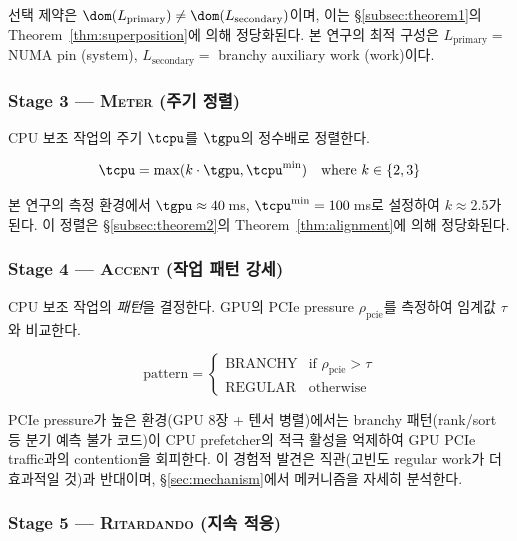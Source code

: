 선택 제약은 $\dom(L_{\text{primary}}) \neq \dom(L_{\text{secondary}})$이며, 이는 \S\ref{subsec:theorem1}의 Theorem~\ref{thm:superposition}에 의해 정당화된다.
본 연구의 최적 구성은 $L_{\text{primary}} = $ NUMA pin (system), $L_{\text{secondary}} = $ branchy auxiliary work (work)이다.

\subsubsection{Stage 3 --- \textsc{Meter} (주기 정렬)}

CPU 보조 작업의 주기 $\tcpu$를 $\tgpu$의 정수배로 정렬한다.

\begin{equation}
\tcpu = \max(k \cdot \tgpu, \tcpu^{\min}) \quad \text{where } k \in \{2, 3\}
\label{eq:meter}
\end{equation}

본 연구의 측정 환경에서 $\tgpu \approx 40$\,ms, $\tcpu^{\min} = 100$\,ms로 설정하여 $k \approx 2.5$가 된다.
이 정렬은 \S\ref{subsec:theorem2}의 Theorem~\ref{thm:alignment}에 의해 정당화된다.



\subsubsection{Stage 4 --- \textsc{Accent} (작업 패턴 강세)}

CPU 보조 작업의 \emph{패턴}을 결정한다.
GPU의 PCIe pressure $\rho_{\text{pcie}}$를 측정하여 임계값 $\tau$와 비교한다.

\begin{equation}
\text{pattern} = \begin{cases}
\mathrm{BRANCHY} & \text{if } \rho_{\text{pcie}} > \tau \\
\mathrm{REGULAR} & \text{otherwise}
\end{cases}
\end{equation}

PCIe pressure가 높은 환경(GPU 8장 + 텐서 병렬)에서는 branchy 패턴(rank/sort 등 분기 예측 불가 코드)이 CPU prefetcher의 적극 활성을 억제하여 GPU PCIe traffic과의 contention을 회피한다.
이 경험적 발견은 직관(고빈도 regular work가 더 효과적일 것)과 반대이며, \S\ref{sec:mechanism}에서 메커니즘을 자세히 분석한다.

\subsubsection{Stage 5 --- \textsc{Ritardando} (지속 적응)}


